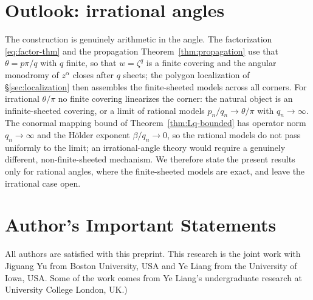 \documentclass[pdflatex,sn-mathphys-num]{sn-jnl}%
\theoremstyle{thmstyleone}
\theoremstyle{thmstyletwo}
\theoremstyle{thmstylethree}
\begin{document}
\section{Outlook: irrational angles}
\label{sec:outlook}

The construction is genuinely arithmetic in the angle. The factorization
\eqref{eq:factor-thm} and the propagation Theorem~\ref{thm:propagation} use that
$\theta=p\pi/q$ with $q$ finite, so that $w=\zeta^{q}$ is a finite covering and
the angular monodromy of $z^{\alpha}$ closes after $q$ sheets; the polygon
localization of \S\ref{sec:localization} then assembles the finite-sheeted
models across all corners. For irrational $\theta/\pi$ no finite covering
linearizes the corner: the natural object is an infinite-sheeted covering, or a
limit of rational models $p_n/q_n\to\theta/\pi$ with $q_n\to\infty$. The conormal
mapping bound of Theorem~\ref{thm:Lq-bounded} has operator norm $q_n\to\infty$
and the H\"older exponent $\beta/q_n\to0$, so the rational models do not pass
uniformly to the limit; an irrational-angle theory would require a genuinely
different, non-finite-sheeted mechanism. We therefore state the present results
only for rational angles, where the finite-sheeted models are exact, and leave
the irrational case open.


\section*{Author’s Important Statements}
All authors are satisfied with this preprint. This research is the joint work with Jiguang Yu from Boston University, USA and Ye Liang from the University of Iowa, USA. Some of the work comes from Ye Liang's undergraduate research at University College London, UK.)




\end{document}
